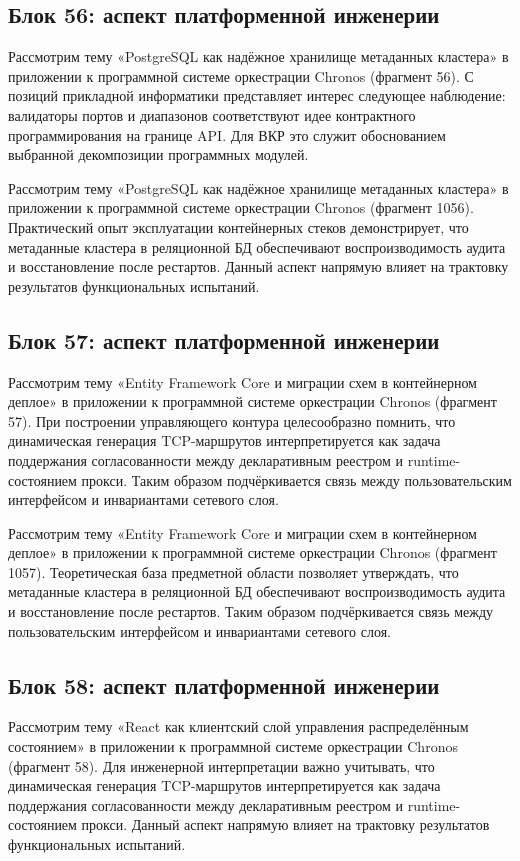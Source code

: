 \subsection{Блок 56: аспект платформенной инженерии}
 Рассмотрим тему «PostgreSQL как надёжное хранилище метаданных кластера» в приложении к программной системе оркестрации Chronos (фрагмент 56). С позиций прикладной информатики представляет интерес следующее наблюдение: валидаторы портов и диапазонов соответствуют идее контрактного программирования на границе API. Для ВКР это служит обоснованием выбранной декомпозиции программных модулей.

 Рассмотрим тему «PostgreSQL как надёжное хранилище метаданных кластера» в приложении к программной системе оркестрации Chronos (фрагмент 1056). Практический опыт эксплуатации контейнерных стеков демонстрирует, что метаданные кластера в реляционной БД обеспечивают воспроизводимость аудита и восстановление после рестартов. Данный аспект напрямую влияет на трактовку результатов функциональных испытаний.

\subsection{Блок 57: аспект платформенной инженерии}
 Рассмотрим тему «Entity Framework Core и миграции схем в контейнерном деплое» в приложении к программной системе оркестрации Chronos (фрагмент 57). При построении управляющего контура целесообразно помнить, что динамическая генерация TCP-маршрутов интерпретируется как задача поддержания согласованности между декларативным реестром и runtime-состоянием прокси. Таким образом подчёркивается связь между пользовательским интерфейсом и инвариантами сетевого слоя.

 Рассмотрим тему «Entity Framework Core и миграции схем в контейнерном деплое» в приложении к программной системе оркестрации Chronos (фрагмент 1057). Теоретическая база предметной области позволяет утверждать, что метаданные кластера в реляционной БД обеспечивают воспроизводимость аудита и восстановление после рестартов. Таким образом подчёркивается связь между пользовательским интерфейсом и инвариантами сетевого слоя.

\subsection{Блок 58: аспект платформенной инженерии}
 Рассмотрим тему «React как клиентский слой управления распределённым состоянием» в приложении к программной системе оркестрации Chronos (фрагмент 58). Для инженерной интерпретации важно учитывать, что динамическая генерация TCP-маршрутов интерпретируется как задача поддержания согласованности между декларативным реестром и runtime-состоянием прокси. Данный аспект напрямую влияет на трактовку результатов функциональных испытаний.

